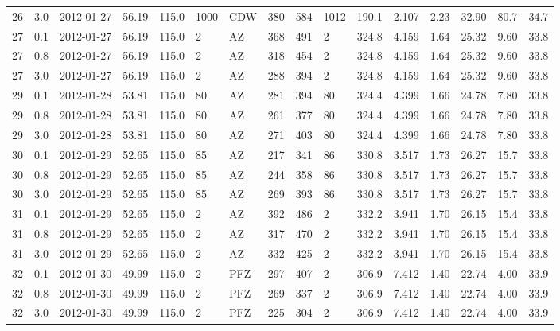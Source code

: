 {\begin{landscape}
\begin{longtable}{llllllllllllllll}
26 & 3.0 & 2012-01-27 & \textminus{}56.19 & 115.0 & 1000 & CDW & 380 & 584 & 1012 & 190.1 & 2.107 & 2.23 & 32.90 & 80.7 & 34.7\\
27 & 0.1 & 2012-01-27 & \textminus{}56.19 & 115.0 & 2 & AZ & 368 & 491 & 2 & 324.8 & 4.159 & 1.64 & 25.32 & 9.60 & 33.8\\
27 & 0.8 & 2012-01-27 & \textminus{}56.19 & 115.0 & 2 & AZ & 318 & 454 & 2 & 324.8 & 4.159 & 1.64 & 25.32 & 9.60 & 33.8\\
27 & 3.0 & 2012-01-27 & \textminus{}56.19 & 115.0 & 2 & AZ & 288 & 394 & 2 & 324.8 & 4.159 & 1.64 & 25.32 & 9.60 & 33.8\\
29 & 0.1 & 2012-01-28 & \textminus{}53.81 & 115.0 & 80 & AZ & 281 & 394 & 80 & 324.4 & 4.399 & 1.66 & 24.78 & 7.80 & 33.8\\
29 & 0.8 & 2012-01-28 & \textminus{}53.81 & 115.0 & 80 & AZ & 261 & 377 & 80 & 324.4 & 4.399 & 1.66 & 24.78 & 7.80 & 33.8\\
29 & 3.0 & 2012-01-28 & \textminus{}53.81 & 115.0 & 80 & AZ & 271 & 403 & 80 & 324.4 & 4.399 & 1.66 & 24.78 & 7.80 & 33.8\\
30 & 0.1 & 2012-01-29 & \textminus{}52.65 & 115.0 & 85 & AZ & 217 & 341 & 86 & 330.8 & 3.517 & 1.73 & 26.27 & 15.7 & 33.8\\
30 & 0.8 & 2012-01-29 & \textminus{}52.65 & 115.0 & 85 & AZ & 244 & 358 & 86 & 330.8 & 3.517 & 1.73 & 26.27 & 15.7 & 33.8\\
30 & 3.0 & 2012-01-29 & \textminus{}52.65 & 115.0 & 85 & AZ & 269 & 393 & 86 & 330.8 & 3.517 & 1.73 & 26.27 & 15.7 & 33.8\\
31 & 0.1 & 2012-01-29 & \textminus{}52.65 & 115.0 & 2 & AZ & 392 & 486 & 2 & 332.2 & 3.941 & 1.70 & 26.15 & 15.4 & 33.8\\
31 & 0.8 & 2012-01-29 & \textminus{}52.65 & 115.0 & 2 & AZ & 317 & 470 & 2 & 332.2 & 3.941 & 1.70 & 26.15 & 15.4 & 33.8\\
31 & 3.0 & 2012-01-29 & \textminus{}52.65 & 115.0 & 2 & AZ & 332 & 425 & 2 & 332.2 & 3.941 & 1.70 & 26.15 & 15.4 & 33.8\\
32 & 0.1 & 2012-01-30 & \textminus{}49.99 & 115.0 & 2 & PFZ & 297 & 407 & 2 & 306.9 & 7.412 & 1.40 & 22.74 & 4.00 & 33.9\\
32 & 0.8 & 2012-01-30 & \textminus{}49.99 & 115.0 & 2 & PFZ & 269 & 337 & 2 & 306.9 & 7.412 & 1.40 & 22.74 & 4.00 & 33.9\\
32 & 3.0 & 2012-01-30 & \textminus{}49.99 & 115.0 & 2 & PFZ & 225 & 304 & 2 & 306.9 & 7.412 & 1.40 & 22.74 & 4.00 & 33.9\\

\end{longtable}
\end{landscape}}
